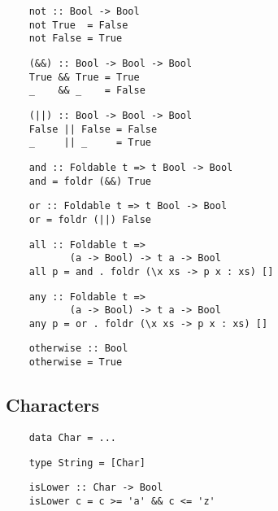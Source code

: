 \begin{multicols}{2}
	\begin{verbatim}
	not :: Bool -> Bool
	not True  = False
	not False = True
	\end{verbatim}
	
	\begin{verbatim}
	(&&) :: Bool -> Bool -> Bool
	True && True = True 
	_    && _    = False
	\end{verbatim}
	
	\begin{verbatim}
	(||) :: Bool -> Bool -> Bool
	False || False = False 
	_     || _     = True
	\end{verbatim}
	
	\begin{verbatim}
	and :: Foldable t => t Bool -> Bool 
	and = foldr (&&) True
	\end{verbatim}
	
	\begin{verbatim}
	or :: Foldable t => t Bool -> Bool 
	or = foldr (||) False
	\end{verbatim}
	
	\begin{verbatim}
	all :: Foldable t => 
	       (a -> Bool) -> t a -> Bool
	all p = and . foldr (\x xs -> p x : xs) []
	\end{verbatim}
	
	\begin{verbatim}
	any :: Foldable t => 
	       (a -> Bool) -> t a -> Bool
	any p = or . foldr (\x xs -> p x : xs) []
	\end{verbatim}
	
	\begin{verbatim}
	otherwise :: Bool
	otherwise = True
	\end{verbatim}
	
	\subsection*{Characters} 
	
	\begin{verbatim}
	data Char = ...
	\end{verbatim}
	
	\begin{verbatim}
	type String = [Char]
	\end{verbatim}
	
	\begin{verbatim}
	isLower :: Char -> Bool 
	isLower c = c >= 'a' && c <= 'z'
	\end{verbatim}
	

\end{multicols}
